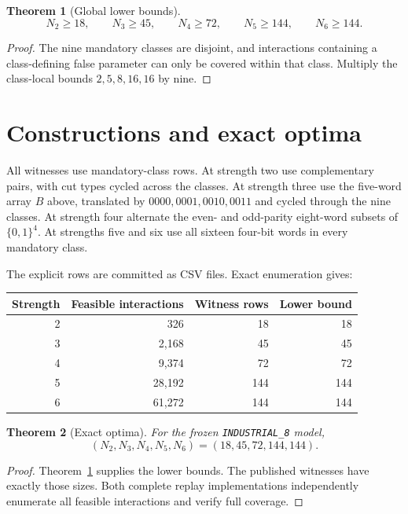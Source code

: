 \documentclass[11pt]{article}
\newtheorem{theorem}{Theorem}
\begin{document}
\begin{theorem}[Global lower bounds]\label{thm:lower}
\[
N_2\ge18,\qquad N_3\ge45,\qquad N_4\ge72,\qquad
N_5\ge144,\qquad N_6\ge144.
\]
\end{theorem}
\begin{proof}
The nine mandatory classes are disjoint, and interactions containing a
class-defining false parameter can only be covered within that class. Multiply
the class-local bounds $2,5,8,16,16$ by nine.
\end{proof}

\section{Constructions and exact optima}
All witnesses use mandatory-class rows. At strength two use complementary
pairs, with cut types cycled across the classes. At strength three use the
five-word array $B$ above, translated by $0000,0001,0010,0011$ and cycled
through the nine classes. At strength four alternate the even- and odd-parity
eight-word subsets of $\{0,1\}^4$. At strengths five and six use all sixteen
four-bit words in every mandatory class.

The explicit rows are committed as CSV files. Exact enumeration gives:
\begin{center}
\begin{tabular}{rrrr}
\toprule
Strength & Feasible interactions & Witness rows & Lower bound\\
\midrule
2 & 326 & 18 & 18\\
3 & 2,168 & 45 & 45\\
4 & 9,374 & 72 & 72\\
5 & 28,192 & 144 & 144\\
6 & 61,272 & 144 & 144\\
\bottomrule
\end{tabular}
\end{center}

\begin{theorem}[Exact optima]\label{thm:main}
For the frozen \texttt{INDUSTRIAL\_8} model,
\[
(N_2,N_3,N_4,N_5,N_6)=(18,45,72,144,144).
\]
\end{theorem}
\begin{proof}
Theorem~\ref{thm:lower} supplies the lower bounds. The published witnesses
have exactly those sizes. Both complete replay implementations independently
enumerate all feasible interactions and verify full coverage.
\end{proof}
\end{document}
